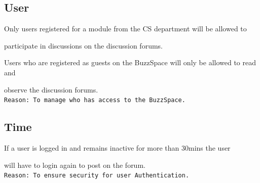 \documentclass[a4paper,12pt]{report}
\begin{document}
\subsection{User}
	\begin{description}
	\item[$\bullet$] 
Only users registered for a module from the CS department will be allowed to 
\item participate in discussions on the discussion forums.
\end{description}

	\begin{description}
	\item[$\bullet$] 
Users who are registered as guests on the BuzzSpace will only be allowed to read and \item observe the discussion forums. \\
\texttt{Reason: To manage who has access to the BuzzSpace.}
\end{description}

\subsection{Time}
	\begin{description}
\item If a user is logged in and remains inactive for more than 30mins the user 
\item will have to login again to post on the forum. \\
\texttt{Reason: To ensure security for user Authentication.}
\end{description}
\end{document}
